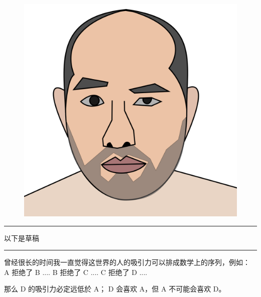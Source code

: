 \documentclass[12pt]{report}
\newcommand{\tab}{\hspace*{1cm}}
\newcommand*\todo{\begin{center}\color{red}  \rule{5cm}{0.5pt} 以下是草稿\, \rule{5cm}{0.5pt} \end{center}}
\begin{document}
\begin{figure}[H]
\centering
\includegraphics[scale=0.3]{self-portrait.png}
\end{figure}

\todo

曾经很长的时间我一直觉得这世界的人的吸引力可以排成数学上的序列，例如： \\
\tab \tab \tab A 拒绝了 B .... B 拒绝了 C .... C 拒绝了 D .... 
\begin{center}
\end{center}
那么 D 的吸引力必定远低於 A； D 会喜欢 A，但 A 不可能会喜欢 D。

\begin{center}
\end{center}
\end{document}
